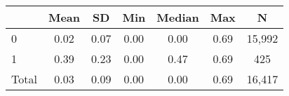 {
\def\sym#1{\ifmmode^{#1}\else\(^{#1}\)\fi}
\begin{tabular}{l*{1}{cccccc}}
\hline\hline
                    &        Mean&          SD&         Min&      Median&         Max&           N\\
\hline
0                   &        0.02&        0.07&        0.00&        0.00&        0.69&      15,992\\
1                   &        0.39&        0.23&        0.00&        0.47&        0.69&         425\\
Total               &        0.03&        0.09&        0.00&        0.00&        0.69&      16,417\\
\hline\hline
\end{tabular}
}
